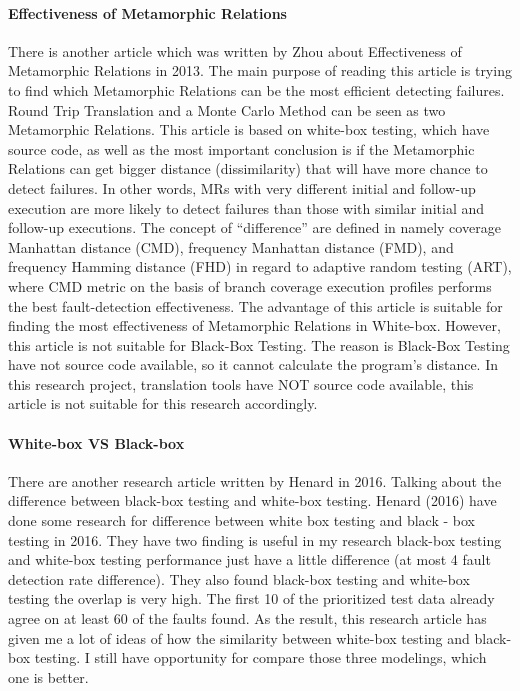 \documentclass[conference]{IEEEtran}
\begin{document}
\paragraph{Effectiveness of Metamorphic Relations}
\cite{cao2013correlation}
There is another article which was written by Zhou about Effectiveness of
Metamorphic Relations in 2013.
The main purpose of reading this article is trying to find which Metamorphic
Relations can be the most efficient detecting failures.
Round Trip Translation and a Monte Carlo Method can be seen as two Metamorphic Relations.
This article is based on white-box testing, which have source code, as well as
the most important conclusion is if the Metamorphic Relations can get bigger
distance (dissimilarity) that will have more chance to detect failures.
In other words, MRs with very different initial and follow-up execution are more
likely to detect failures than those with similar initial and follow-up
executions.
The concept of ``difference'' are defined in namely coverage Manhattan distance
(CMD), frequency Manhattan distance (FMD), and frequency Hamming distance (FHD)
in regard to adaptive random testing (ART), where CMD metric on the basis of
branch coverage execution profiles performs the best fault-detection
effectiveness.
The advantage of this article is suitable for finding the most effectiveness of
Metamorphic Relations in White-box.
However, this article is not suitable for Black-Box Testing. The reason is
Black-Box Testing have not source code available, so it cannot calculate the
program’s distance.
In this research project, translation tools have NOT source code available, this
article is not suitable for this research accordingly.
\paragraph{White-box VS Black-box}
\cite{henard2016comparing}
There are another research article written by Henard in 2016. Talking about the difference between black-box testing and white-box testing.
Henard (2016) have done some research for difference between white box testing
and black - box testing in 2016. They have two finding is useful in my research
black-box testing and white-box testing performance just have a little
difference (at most 4 fault detection rate difference). They also found
black-box testing and white-box testing the overlap is
very high. The first 10 of the prioritized test data
already agree on at least 60 of the faults found. As the
result, this research article has given me a lot of ideas of how the similarity between white-box testing and black-box
testing. I still have opportunity for compare those three
modelings, which one is better.
\pagebreak
\pagebreak
\end{document}
